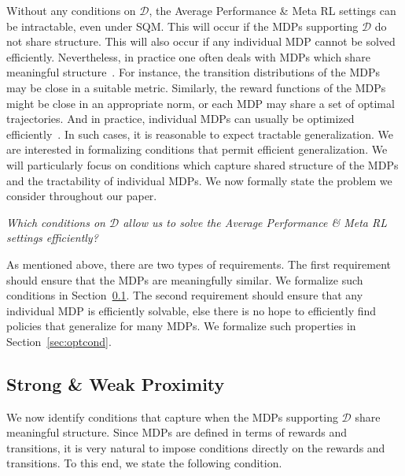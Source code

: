 \documentclass[11pt,twoside]{article}
\begin{document}
Without any conditions on $\mathcal{D}$, the Average Performance \& Meta RL settings can be intractable, even under SQM. This will occur if the MDPs supporting $\mathcal{D}$ do not share structure. This will also occur if any individual MDP cannot be solved efficiently. Nevertheless, in practice one often deals with MDPs which share meaningful structure~\citep{cobbe19, rakelly19}. For instance, the transition distributions of the MDPs may be close in a suitable metric. Similarly, the reward functions of the MDPs might be close in an appropriate norm, or each MDP may share a set of optimal trajectories. And in practice, individual MDPs can usually be optimized efficiently~\citep{packer18, yu19}. In such cases, it is reasonable to expect tractable generalization. We are interested in formalizing conditions that permit efficient generalization. We will particularly focus on conditions which capture shared structure of the MDPs and the tractability of individual MDPs. We now formally state the problem we consider throughout our paper.
\begin{center}
\emph{Which conditions on $\mathcal{D}$ allow us to solve the Average Performance \& Meta RL settings efficiently?}
\end{center}
As mentioned above, there are two types of requirements. The first requirement should ensure that the MDPs are meaningfully similar. We formalize such conditions in Section~\ref{sec:spwp}. The second requirement should ensure that any individual MDP is efficiently solvable, else there is no hope to efficiently find policies that generalize for many MDPs. We formalize such properties in Section~\ref{sec:optcond}.

\subsection{Strong \& Weak Proximity}
\label{sec:spwp}
We now identify conditions that capture when the MDPs supporting $\mathcal{D}$ share meaningful structure. Since MDPs are defined in terms of rewards and transitions, it is very natural to impose conditions directly on the rewards and transitions. To this end, we state the following condition.
\end{document}
